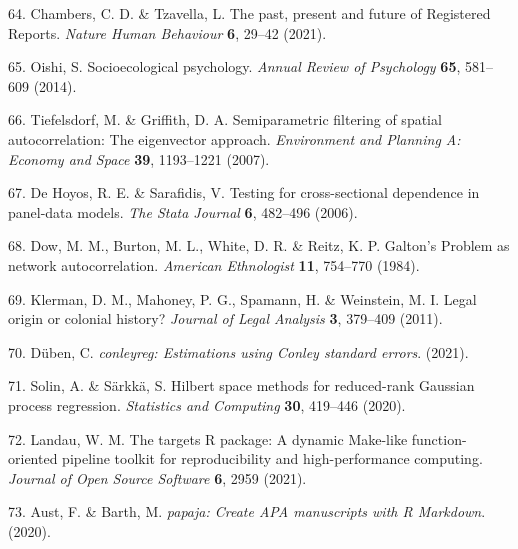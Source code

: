 \documentclass[
  english,
  man,floatsintext]{apa6}
\begin{document}
\leavevmode\hypertarget{ref-Chambers2021}{}%
64. Chambers, C. D. \& Tzavella, L. The past, present and future of Registered Reports. \emph{Nature Human Behaviour} \textbf{6}, 29--42 (2021).

\leavevmode\hypertarget{ref-Oishi2013}{}%
65. Oishi, S. Socioecological psychology. \emph{Annual Review of Psychology} \textbf{65}, 581--609 (2014).

\leavevmode\hypertarget{ref-Tiefelsdorf2007}{}%
66. Tiefelsdorf, M. \& Griffith, D. A. Semiparametric filtering of spatial autocorrelation: The eigenvector approach. \emph{Environment and Planning A: Economy and Space} \textbf{39}, 1193--1221 (2007).

\leavevmode\hypertarget{ref-DeHoyos2006}{}%
67. De Hoyos, R. E. \& Sarafidis, V. Testing for cross-sectional dependence in panel-data models. \emph{The Stata Journal} \textbf{6}, 482--496 (2006).

\leavevmode\hypertarget{ref-Dow1984}{}%
68. Dow, M. M., Burton, M. L., White, D. R. \& Reitz, K. P. Galton's Problem as network autocorrelation. \emph{American Ethnologist} \textbf{11}, 754--770 (1984).

\leavevmode\hypertarget{ref-Klerman2011}{}%
69. Klerman, D. M., Mahoney, P. G., Spamann, H. \& Weinstein, M. I. Legal origin or colonial history? \emph{Journal of Legal Analysis} \textbf{3}, 379--409 (2011).

\leavevmode\hypertarget{ref-Duben2021}{}%
70. Düben, C. \emph{conleyreg: Estimations using Conley standard errors}. (2021).

\leavevmode\hypertarget{ref-Solin2020}{}%
71. Solin, A. \& Särkkä, S. Hilbert space methods for reduced-rank Gaussian process regression. \emph{Statistics and Computing} \textbf{30}, 419--446 (2020).

\leavevmode\hypertarget{ref-Landau2021}{}%
72. Landau, W. M. The targets R package: A dynamic Make-like function-oriented pipeline toolkit for reproducibility and high-performance computing. \emph{Journal of Open Source Software} \textbf{6}, 2959 (2021).

\leavevmode\hypertarget{ref-Aust2020}{}%
73. Aust, F. \& Barth, M. \emph{papaja: Create APA manuscripts with R Markdown}. (2020).

\endgroup


\clearpage
\makeatletter
\efloat@restorefloats
\makeatother
\end{document}
